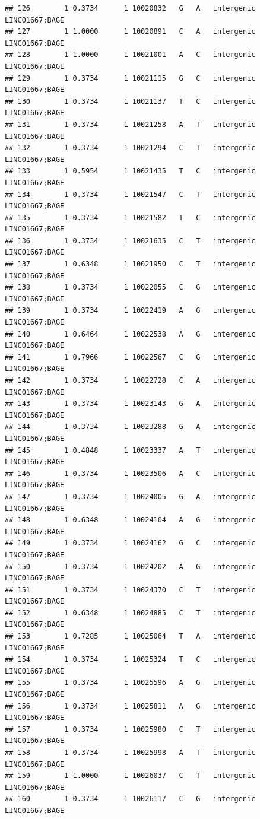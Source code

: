 \documentclass[
]{article}
\begin{document}
\begin{verbatim}
## 126        1 0.3734      1 10020832   G   A   intergenic LINC01667;BAGE
## 127        1 1.0000      1 10020891   C   A   intergenic LINC01667;BAGE
## 128        1 1.0000      1 10021001   A   C   intergenic LINC01667;BAGE
## 129        1 0.3734      1 10021115   G   C   intergenic LINC01667;BAGE
## 130        1 0.3734      1 10021137   T   C   intergenic LINC01667;BAGE
## 131        1 0.3734      1 10021258   A   T   intergenic LINC01667;BAGE
## 132        1 0.3734      1 10021294   C   T   intergenic LINC01667;BAGE
## 133        1 0.5954      1 10021435   T   C   intergenic LINC01667;BAGE
## 134        1 0.3734      1 10021547   C   T   intergenic LINC01667;BAGE
## 135        1 0.3734      1 10021582   T   C   intergenic LINC01667;BAGE
## 136        1 0.3734      1 10021635   C   T   intergenic LINC01667;BAGE
## 137        1 0.6348      1 10021950   C   T   intergenic LINC01667;BAGE
## 138        1 0.3734      1 10022055   C   G   intergenic LINC01667;BAGE
## 139        1 0.3734      1 10022419   A   G   intergenic LINC01667;BAGE
## 140        1 0.6464      1 10022538   A   G   intergenic LINC01667;BAGE
## 141        1 0.7966      1 10022567   C   G   intergenic LINC01667;BAGE
## 142        1 0.3734      1 10022728   C   A   intergenic LINC01667;BAGE
## 143        1 0.3734      1 10023143   G   A   intergenic LINC01667;BAGE
## 144        1 0.3734      1 10023288   G   A   intergenic LINC01667;BAGE
## 145        1 0.4848      1 10023337   A   T   intergenic LINC01667;BAGE
## 146        1 0.3734      1 10023506   A   C   intergenic LINC01667;BAGE
## 147        1 0.3734      1 10024005   G   A   intergenic LINC01667;BAGE
## 148        1 0.6348      1 10024104   A   G   intergenic LINC01667;BAGE
## 149        1 0.3734      1 10024162   G   C   intergenic LINC01667;BAGE
## 150        1 0.3734      1 10024202   A   G   intergenic LINC01667;BAGE
## 151        1 0.3734      1 10024370   C   T   intergenic LINC01667;BAGE
## 152        1 0.6348      1 10024885   C   T   intergenic LINC01667;BAGE
## 153        1 0.7285      1 10025064   T   A   intergenic LINC01667;BAGE
## 154        1 0.3734      1 10025324   T   C   intergenic LINC01667;BAGE
## 155        1 0.3734      1 10025596   A   G   intergenic LINC01667;BAGE
## 156        1 0.3734      1 10025811   A   G   intergenic LINC01667;BAGE
## 157        1 0.3734      1 10025980   C   T   intergenic LINC01667;BAGE
## 158        1 0.3734      1 10025998   A   T   intergenic LINC01667;BAGE
## 159        1 1.0000      1 10026037   C   T   intergenic LINC01667;BAGE
## 160        1 0.3734      1 10026117   C   G   intergenic LINC01667;BAGE

\end{verbatim}
\end{document}
